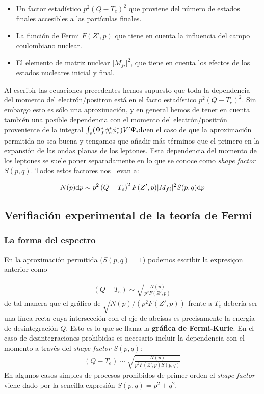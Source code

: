 \begin{itemize}
	\item Un factor estadístico $p^2 (Q-T_e)^2$ que proviene del número de estados finales accesibles a las partículas finales.
	\item La función de Fermi $F(Z',p)$ que tiene en cuenta la influencia del campo coulombiano nuclear.
	\item El elemento de matriz nuclear $|M_{fi}|^2$, que tiene en cuenta los efectos de los estados nucleares inicial y final.
\end{itemize}

Al escribir las ecuaciones precedentes hemos supuesto que toda la dependencia del momento del electrón/positron está en el facto estadístico $p^2(Q-T_e)^2$. Sin embargo esto es sólo una aproximación, y en general hemos de tener en cuenta también una posible dependencia con el momento del electrón/positrón proveniente de la integral $\int_v (\Psi_f^* \phi_e^* \phi_\nu^*) V' \Psi_i \mathrm{d} v$en el caso de que la aproximación permitida no sea buena y tengamos que añadir más términos que el primero en la expansión de las ondas planas de los leptones. Esta dependencia del momento de los leptones se suele poner separadamente en lo que se conoce como \textit{shape factor} $S(p,q)$. Todos estos factores nos llevan a:

\begin{eqnarray}
	N(p) \mathrm{d} p \sim p^2 \left( Q-T_e \right)^2 F(Z',p) |M_{fi}|^2 S(p,q) \mathrm{d} p
\end{eqnarray}

\subsection{Verifiación experimental de la teoría de Fermi}

\subsubsection{La forma del espectro}

En la aproximación permitida $(S(p,q)=1$) podemos escribir la expresiçon anterior como

\begin{eqnarray}
	(Q-T_e) \sim \sqrt{\frac{N(p)}{p^2 F(Z',p)}}
\end{eqnarray}
de tal manera que el gráfico de $\sqrt{N(p)/(p^2 F(Z',p))}$ frente a $T_e$ debería ser una línea recta cuya intersección con el eje de abcisas es precisamente la energía de desintegración $Q$. Esto es lo que se llama la \textbf{gráfica de Fermi-Kurie}. En el caso de desintegraciones prohibidas es necesario incluir la dependencia con el momento a través del \textit{shape factor} $S(p,q)$:
\begin{eqnarray}
	(Q-T_e) \sim \sqrt{\frac{N(p)}{p^2 F(Z',p)S(p,q)}}
\end{eqnarray}
En algunos casos simples de procesos prohibidos de primer orden el \textit{shape factor} viene dado por la sencilla expresión $S(p,q)=p^2 + q^2$.

